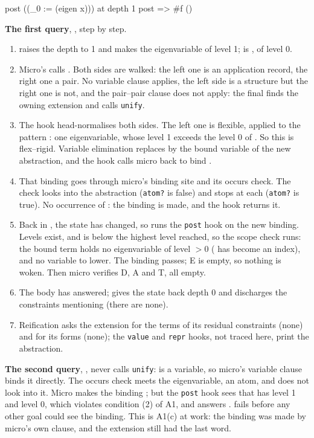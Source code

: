 \begin{tutorial}[One \texttt{=°} on a λ-term, through micro and the hooks]
\begin{answers}
  post   ((_0 := (eigen x))) at depth 1
  post   => #f
()
\end{answers}
\textbf{The first query}, , step by step.
\begin{enumerate}
\item {} raises the depth to 1 and makes the eigenvariable  of level 1;  is
  , of level 0.
\item Micro's  calls . Both sides are walked: the left one is an
  application record, the right one a pair. No variable clause applies, the left side is a structure
  but the right one is not, and the pair--pair clause does not apply: the final  finds the
  owning extension and calls \texttt{unify}.
\item The hook head-normalises both sides. The left one is flexible,  applied to the pattern
  : one eigenvariable, whose level 1 exceeds the level 0 of . So this is flex--rigid. Variable
  elimination replaces  by the bound variable of the new abstraction, and the hook calls micro
  back to bind .
\item That binding goes through micro's binding site and its occurs check. The check looks into the
  abstraction (\texttt{atom?} is false) and stops at each  (\texttt{atom?} is true). No
  occurrence of : the binding is made, and the hook returns it.
\item Back in , the state has changed, so  runs the \texttt{post} hook
  on the new binding. Levels exist, and  is below the highest level reached, so the scope check
  runs: the bound term holds no eigenvariable of level $>0$ ( has become an index), and no
  variable to lower. The binding passes; E is empty, so nothing is woken. Then micro verifies D, A and
  T, all empty.
\item The  body has answered;  gives the state back depth 0 and discharges the
  constraints mentioning  (there are none).
\item Reification asks the extension for the terms of its residual constraints (none) and for its
  forms (none); the \texttt{value} and \texttt{repr} hooks, not traced here, print the abstraction.
\end{enumerate}
\textbf{The second query}, , never calls \texttt{unify}:  is a variable,
so micro's variable clause binds it directly. The occurs check meets the eigenvariable, an atom, and
does not look into it. Micro makes the binding ; but the \texttt{post} hook sees that
 has level 1 and  level 0, which violates condition (2) of A1, and answers .
 fails before any other goal could see the binding. This is A1(c) at work: the binding was
made by micro's own clause, and the extension still had the last word.
\end{tutorial}

